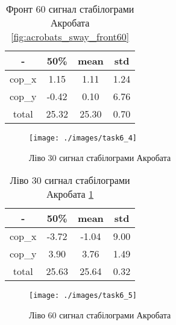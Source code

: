 \begin{table}[!ht]
    \centering
    \caption{Фронт 60 сигнал стабілограми Акробата \ref{fig:acrobats_sway_front60}}
    \label{tab:acrobats_sway_front60}

    \begin{tabular}{|c|c|c|c|}
        \toprule
        -      & 50\%  & mean  & std  \\

        \midrule
        cop\_x & 1.15  & 1.11  & 1.24 \\
        \hline
        cop\_y & -0.42 & 0.10  & 6.76 \\

        \bottomrule
        total  & 25.32 & 25.30 & 0.70 \\
        \hline
    \end{tabular}
\end{table}

\begin{figure}[!ht]
    \centering
    \texttt{[image: ./images/task6\_4]}
    \caption{Ліво 30 сигнал стабілограми Акробата}
    \label{fig:acrobats_sway_left30}
\end{figure}

\begin{table}[!ht]
    \centering
    \caption{Ліво 30 сигнал стабілограми Акробата \ref{fig:acrobats_sway_left30}}
    \label{tab:acrobats_sway_left30}

    \begin{tabular}{|c|c|c|c|}
        \toprule
        -      & 50\%  & mean  & std  \\

        \midrule
        cop\_x & -3.72 & -1.04 & 9.00 \\
        \hline
        cop\_y & 3.90  & 3.76  & 1.49 \\

        \bottomrule
        total  & 25.63 & 25.64 & 0.32 \\
        \hline
    \end{tabular}
\end{table}

\begin{figure}[!ht]
    \centering
    \texttt{[image: ./images/task6\_5]}
    \caption{Ліво 60 сигнал стабілограми Акробата}
    \label{fig:acrobats_sway_left60}
\end{figure}

